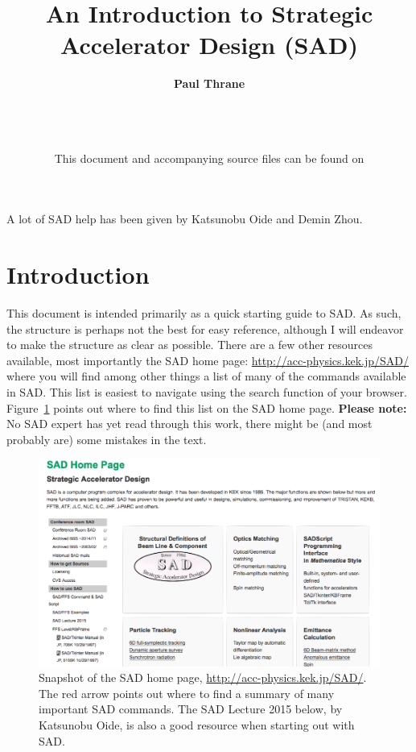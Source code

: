 \documentclass{article}
\title{\huge{An Introduction to Strategic Accelerator Design (SAD)}}
\author{\textbf{Paul Thrane}}
\date{
	\sadDate \\ \ \\ \ \\
	This document and accompanying source files can be found on\\
	\sourceLocation}
\begin{document}
\maketitle
A lot of SAD help has been given by Katsunobu Oide and Demin Zhou.



\newpage
\tableofcontents
\newpage


\section{Introduction}

This document is intended primarily as a quick starting guide to SAD. As such, the structure is perhaps not the best for easy reference, although I will endeavor to make the structure as clear as possible.
There are a few other resources available, most importantly the SAD home page: \url{http://acc-physics.kek.jp/SAD/} where you will find among other things a list of many of the commands available in SAD. This list is easiest to navigate using the search function of your browser. Figure~\ref{fig:sadHomePage} points out where to find this list on the SAD home page.
\textbf{Please note:} No SAD expert has yet read through this work, there might be (and most probably are) some mistakes in the text.

\begin{figure}[h]
	\begin{center}
	\includegraphics[width=0.75\columnwidth]{figures/sadHomePage.png}
	\end{center}
	\caption{Snapshot of the SAD home page, \url{http://acc-physics.kek.jp/SAD/}. The red arrow points out where to find a summary of many important SAD commands. The SAD Lecture 2015 below, by Katsunobu Oide, is also a good resource when starting out with SAD.}
	\label{fig:sadHomePage}
\end{figure}
\end{document}
